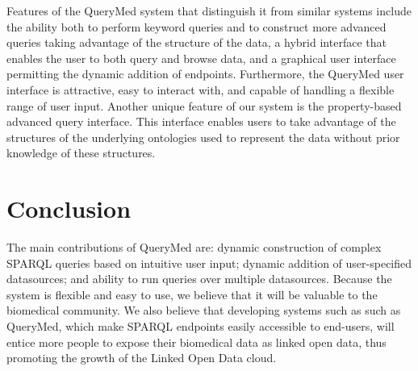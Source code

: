 \documentclass{acm_proc_article-sp}
\begin{document}
Features of the QueryMed system that distinguish it from similar systems include the ability both to perform keyword queries and to construct more advanced queries taking advantage of the structure of the data, a hybrid interface that enables the user to both query and browse data, and a graphical user interface permitting the dynamic addition of endpoints.  Furthermore, the QueryMed user interface is attractive, easy to interact with, and capable of handling a flexible range of user input.  Another unique feature of our system is the property-based advanced query interface. This interface enables users to take advantage of the structures of the underlying ontologies used to represent the data without prior knowledge of these structures. 

\section{Conclusion}
\label{conclusion}

The main contributions of QueryMed are: dynamic construction of complex SPARQL queries based on intuitive user input; dynamic addition of user-specified datasources; and ability to run queries over multiple datasources. Because the system is flexible and easy to use, we believe that it will be valuable to the biomedical community.  We also believe that developing systems such as such as QueryMed, which make SPARQL endpoints  easily accessible to end-users, will entice more people to expose their biomedical data as linked open data, thus promoting the growth of the Linked Open Data cloud.



\end{document}
